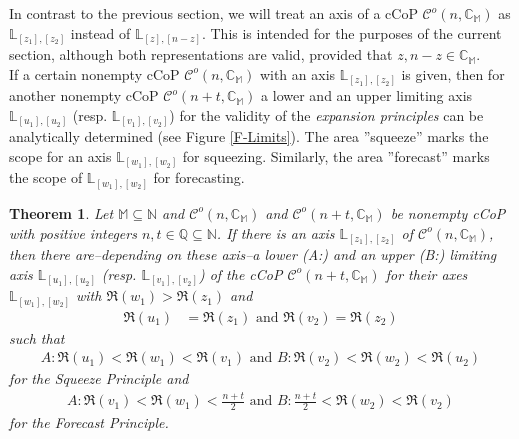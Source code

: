 \documentclass[12pt]{amsart}
\newtheorem{theorem}{Theorem}[section]
\theoremstyle{definition}
\theoremstyle{remark}
\numberwithin{equation}{section}
\newcommand{\C}{\mathcal{C}}
\newcommand{\CC}{\mathbb{C}}
\newcommand{\M}{\mathbb{M}}
\newcommand{\N}{\mathbb{N}}
\newcommand{\LL}{\mathbb{L}}
\begin{document}
In contrast to the previous section, we will treat an axis of a cCoP $\C^o(n,\CC_{\M})$ as $\LL_{[z_1],[z_2]}$ instead of $\LL_{[z],[n-z]}$. This is intended for the purposes of the current section, although both representations are valid, provided that $z,n-z\in \CC_{\M}$.\\

If a certain nonempty cCoP $\C^o(n,\CC_{\M})$ with an axis $\LL_{[z_1],[z_2]}$ is given, then for another nonempty cCoP $\C^o(n+t,\CC_{\M})$ a lower and an upper limiting axis  $\LL_{[u_1],[u_2]}$ (resp.  $\LL_{[v_1],[v_2]}$) for the validity of the \emph{expansion principles} can be analytically determined  (see Figure \ref{F-Limits}). The area ''squeeze'' marks the scope for an axis $\LL_{[w_1],[w_2]}$ for squeezing. Similarly, the area ''forecast'' marks the scope of $\LL_{[w_1],[w_2]}$ for forecasting. 


\begin{theorem}\label{T-Limits}
Let $\M\subseteq\N$ and $\C^o(n,\CC_{\M})$ and $\C^o(n+t,\CC_{\M})$ be nonempty cCoP with positive integers $n,t\in\mathbb{Q}\subseteq\N$. If there is an axis $\LL_{[z_1],[z_2]}$ of $\C^o(n,\CC_{\M})$, then there are--depending on these axis--a lower (A:) and an upper (B:) limiting axis $\LL_{[u_1],[u_2]}$ (resp.  $\LL_{[v_1],[v_2]}$) of the cCoP $\C^o(n+t,\CC_{\M})$ for their axes $\LL_{[w_1],[w_2]}$ with $\Re(w_1)>\Re(z_1)$ and
\begin{align}
\Re(u_1)&=\Re(z_1) \mbox{ and } \Re(v_2)=\Re(z_2)\label{E-z1u1v2z2}
\end{align}
such that
\begin{align}
A: \Re(u_1)<\Re(w_1)<\Re(v_1)\text{ and }B: \Re(v_2)<\Re(w_2)<\Re(u_2)\label{E-ForSqueeze}
\end{align}
for the Squeeze Principle and
\begin{align}
A: \Re(v_1)<\Re(w_1)<\frac{n+t}{2}\text{ and }B: \frac{n+t}{2}<\Re(w_2)<\Re(v_2)\label{E-ForForecast}
\end{align}
for the Forecast Principle.
\end{theorem}
\end{document}
